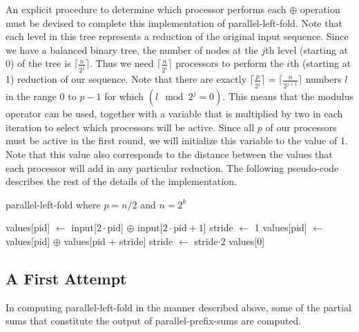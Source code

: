 \documentclass[12pt,twoside]{reedthesis}
\begin{document}
An explicit procedure to determine which processor performs each
$\oplus$ operation must be devised to complete this implementation of
parallel-left-fold. Note that each level in this tree represents a reduction of the original input
sequence. Since we have a balanced binary tree, the number of nodes at
the $j$th level (starting at 0) of the tree is  $\lceil \frac{n}{2^j}
\rceil$. Thus we need $\lceil \frac{n}{2^i}\rceil$ processors to
perform the $i$th (starting at 1) reduction of our sequence.
Note that there are exactly $\lceil \frac{p}{2^j} \rceil = \lceil
\frac{n}{2^{j+1}} \rceil$ numbers $l$ in the range 0 to $p-1$ for
which $(l \mod 2^j = 0)$. This means that the modulus operator can be
used, together with a variable that is multiplied by two in each
iteration to select which processors will be active. Since all $p$ of
our processors must be active in the first round, we will initialize
this variable to the value of 1. Note that this value also corresponds
to the distance between the values that each processor will add in any
particular reduction. The following pseudo-code describes the rest of
the details of the implementation.

\begin{algorithm}[h!]
\caption{parallel-left-fold where $p = n/2$ and $n=2^k$}
\begin{algorithmic}
\STATE values[pid] $\leftarrow$ input[$2\cdot \mbox{pid}$] $\oplus$ input[$2\cdot \mbox{pid} +1$]
\STATE stride $\leftarrow$ 1
\STATE values[pid] $\leftarrow$ values[pid] $\oplus$ values[pid $+$ stride] 
\STATE stride $\leftarrow$ stride$\cdot 2$
\ENDWHILE
\RETURN values[0]
\end{algorithmic}
\end{algorithm}


\vspace{3pc}
\subsection{A First Attempt}

In computing parallel-left-fold in the manner described above, some of the partial sums that constitute the output of parallel-prefix-sums are computed.
\end{document}
